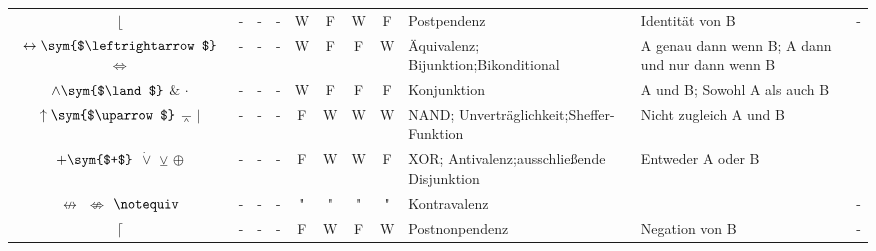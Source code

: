 \documentclass[english,ngerman,parskip=half,headsepline,footsepline,
	fleqn,notitlepage]{scrreprt}
\newcommand*{\ladd}{+}
\newcommand*{\lmult}{\cdot}
\newcommand*{\texttrue}{W}%
\newcommand*{\textfalse}{F}%
\newcommand*{\lright}{\operatorname{\lfloor}}%
\newcommand*{\lequiv}{\leftrightarrow}%
\newcommand*{\lequivA}{\Leftrightarrow}%
\newcommand*{\landA}{\&}
\newcommand*{\landB}{\lmult}
\newcommand*{\lnand}{\uparrow}%
\newcommand*{\lnandA}{\barwedge}%
\newcommand*{\lnandB}{\mid}%
\newcommand*{\lxor}{\ladd}%
\newcommand*{\lxorA}{\operatorname{\dot\lor}}%
\newcommand*{\lxorB}{\veebar}%
\newcommand*{\lxorC}{\oplus}%
\newcommand*{\lnequiv}{\nleftrightarrow}%
\newcommand*{\lnequivA}{\nLeftrightarrow}%
\newcommand*{\lnequivB}{\notequiv}%
\newcommand*{\lnright}{\lceil}%
\newcommand*{\Sym}[1]{#1\sym{$#1$}}%
\begin{document}
\begin{table}
\begin{threeparttable}
\begin{tabularx}{\linewidth-10.95pt}{c||c:cc:cccc|X:X|c|}
				\tableline%

				$\lright$
				& - & - & - &\texttrue&\textfalse&\texttrue&\textfalse
				& Postpendenz
				& Identität von B
				& - \\

				\tableline%

				$\Sym{\lequiv}$ $\lequivA$
				& - & - & - &\texttrue&\textfalse&\textfalse&\texttrue
				& Äquivalenz; Bijunktion;\newline Bikonditional
				& A genau dann wenn B; A dann und nur dann wenn B
				& \thepequiv \\

				\tableline%

				$\Sym{\land}$ $\landA$ $\landB$
				& - & - & - &\texttrue&\textfalse&\textfalse&\textfalse
				& Konjunktion
				& {\small A und B; Sowohl A als auch B}
				& \thepand \\

				\tablegroup%

				$\Sym{\lnand}$ $\lnandA$ $\lnandB$
				& - & - & - &\textfalse&\texttrue&\texttrue&\texttrue
				& NAND; Unverträglichkeit;\newline Sheffer-Funktion
				& Nicht zugleich A und B
				& \thepnand \\

				\tableline%

				$\Sym{\lxor}$ $\lxorA$ $\lxorB$ $\lxorC$
				& - & - & - &\textfalse&\texttrue&\texttrue&\textfalse
				& XOR; Antivalenz;\newline ausschließende Disjunktion
				& Entweder A oder B
				& \thepxor \\

				\gapline%

				$\lnequiv$ $\lnequivA$ $\lnequivB$
				& - & - & - &"&"&"&"
				& Kontravalenz
				&
				& - \\

				\tableline%

				$\lnright$
				& - & - & - &\textfalse&\texttrue&\textfalse&\texttrue
				& Postnonpendenz
				& Negation von B
				& - \\


\end{tabularx}
\end{threeparttable}
\end{table}
\end{document}
